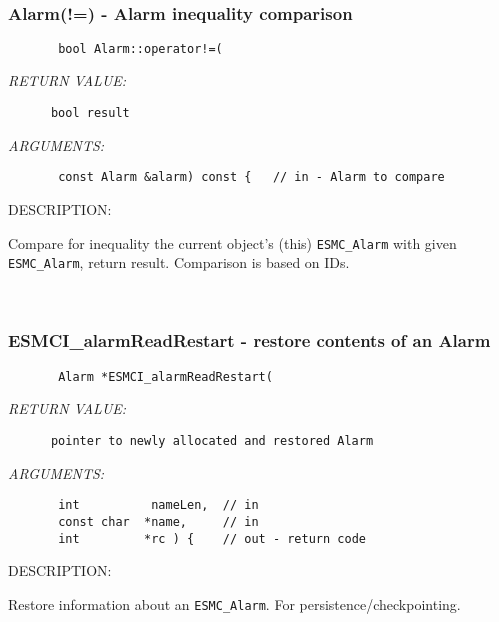  
\mbox{}\hrulefill\ 
 
\subsubsection [Alarm(!=)] {Alarm(!=) - Alarm inequality comparison }


  
\begin{verbatim}       bool Alarm::operator!=(\end{verbatim}{\em RETURN VALUE:}
\begin{verbatim}      bool result\end{verbatim}{\em ARGUMENTS:}
\begin{verbatim}       const Alarm &alarm) const {   // in - Alarm to compare\end{verbatim}
{\sf DESCRIPTION:\\ }


        Compare for inequality the current object's (this)
        {\tt ESMC\_Alarm} with given {\tt ESMC\_Alarm}, return result.
        Comparison is based on IDs.
   
 
\mbox{}\hrulefill\ 
 
\subsubsection [ESMCI\_alarmReadRestart] {ESMCI\_alarmReadRestart - restore contents of an Alarm}


  
\begin{verbatim}       Alarm *ESMCI_alarmReadRestart(\end{verbatim}{\em RETURN VALUE:}
\begin{verbatim}      pointer to newly allocated and restored Alarm\end{verbatim}{\em ARGUMENTS:}
\begin{verbatim}       int          nameLen,  // in
       const char  *name,     // in
       int         *rc ) {    // out - return code
 \end{verbatim}
{\sf DESCRIPTION:\\ }


        Restore information about an {\tt ESMC\_Alarm}.
        For persistence/checkpointing.
   
